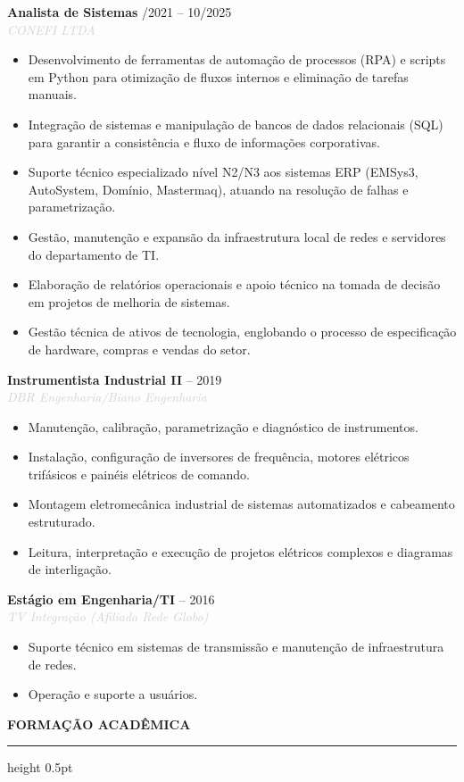\documentclass[10pt,a4paper]{article}
\newcommand{\cvsection}[1]{
    \vspace{12pt}
    {\large\textcolor{sectcol}{\textbf{\MakeUppercase{#1}}}}
    \vspace{2pt}
    \hrule height 0.5pt \relax
    \vspace{6pt}
}
\newcommand{\cvevent}[4]{
    \noindent \textbf{#2} \hfill \textcolor{sectcol}{\small \faCalendar* #1} \\
    \noindent \textit{\textcolor{lightgray}{#3}} \vspace{4pt} \\
    {#4} \vspace{8pt}
}
\begin{document}
\cvevent{06/2021 – 10/2025}{Analista de Sistemas}{CONEFI LTDA}{
\begin{itemize}
    \item Desenvolvimento de ferramentas de automação de processos (RPA) e scripts em Python para otimização de fluxos internos e eliminação de tarefas manuais.
    \item Integração de sistemas e manipulação de bancos de dados relacionais (SQL) para garantir a consistência e fluxo de informações corporativas.
    \item Suporte técnico especializado nível N2/N3 aos sistemas ERP (EMSys3, AutoSystem, Domínio, Mastermaq), atuando na resolução de falhas e parametrização.
    \item Gestão, manutenção e expansão da infraestrutura local de redes e servidores do departamento de TI.
    \item Elaboração de relatórios operacionais e apoio técnico na tomada de decisão em projetos de melhoria de sistemas.
    \item Gestão técnica de ativos de tecnologia, englobando o processo de especificação de hardware, compras e vendas do setor.
\end{itemize}
}

\cvevent{2016 – 2019}{Instrumentista Industrial II}{DBR Engenharia/Biano Engenharia}{
\begin{itemize}
    \item Manutenção, calibração, parametrização e diagnóstico de instrumentos.   
    \item Instalação, configuração de inversores de frequência, motores elétricos trifásicos e painéis elétricos de comando.  
    \item Montagem eletromecânica industrial de sistemas automatizados e cabeamento estruturado.  
    \item Leitura, interpretação e execução de projetos elétricos complexos e diagramas de interligação.
\end{itemize}
}

\cvevent{2014 – 2016}{Estágio em Engenharia/TI}{TV Integração (Afiliada Rede Globo)}{
\begin{itemize}
    \item Suporte técnico em sistemas de transmissão e manutenção de infraestrutura de redes.
    \item Operação e suporte a usuários.
\end{itemize}
}

\cvsection{Formação Acadêmica}
\end{document}
